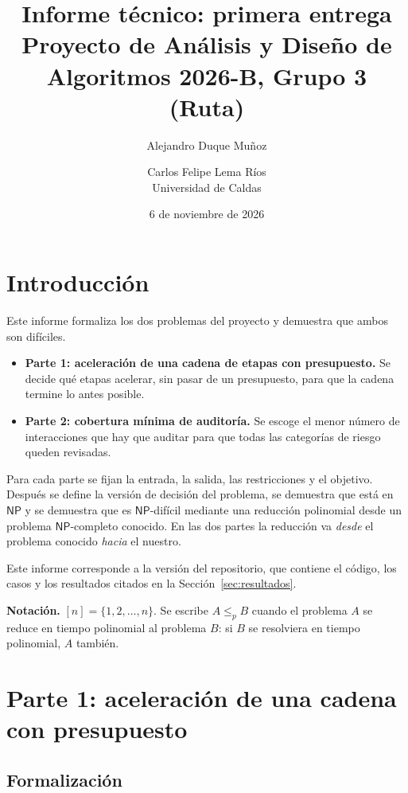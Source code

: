 \documentclass[11pt,a4paper]{article}
\title{Informe técnico: primera entrega\\[0.3em]
\large Proyecto de Análisis y Diseño de Algoritmos 2026-B, Grupo 3 (Ruta)}
\author{Alejandro Duque Muñoz \and Carlos Felipe Lema Ríos\\[0.3em]
Universidad de Caldas}
\date{6 de noviembre de 2026}
\theoremstyle{definition}
\newcommand{\NP}{\mathsf{NP}}
\newcommand{\pol}{\le_p}
\begin{document}
\maketitle

\section{Introducción}

Este informe formaliza los dos problemas del proyecto y demuestra que ambos son difíciles.

\begin{itemize}[nosep]
  \item \textbf{Parte 1: aceleración de una cadena de etapas con presupuesto.} Se decide qué etapas acelerar, sin pasar de un presupuesto, para que la cadena termine lo antes posible.
  \item \textbf{Parte 2: cobertura mínima de auditoría.} Se escoge el menor número de interacciones que hay que auditar para que todas las categorías de riesgo queden revisadas.
\end{itemize}

Para cada parte se fijan la entrada, la salida, las restricciones y el objetivo. Después se define la versión de decisión del problema, se demuestra que está en $\NP$ y se demuestra que es $\NP$-difícil mediante una reducción polinomial desde un problema $\NP$-completo conocido. En las dos partes la reducción va \emph{desde} el problema conocido \emph{hacia} el nuestro.

Este informe corresponde a la versión \texttt{\VersionEntrega} del repositorio, que contiene el código, los casos y los resultados citados en la Sección~\ref{sec:resultados}.

\textbf{Notación.} $[n]=\{1,2,\dots,n\}$. Se escribe $A\pol B$ cuando el problema $A$ se reduce en tiempo polinomial al problema $B$: si $B$ se resolviera en tiempo polinomial, $A$ también.

\section{Parte 1: aceleración de una cadena con presupuesto}

\subsection{Formalización}
\end{document}
